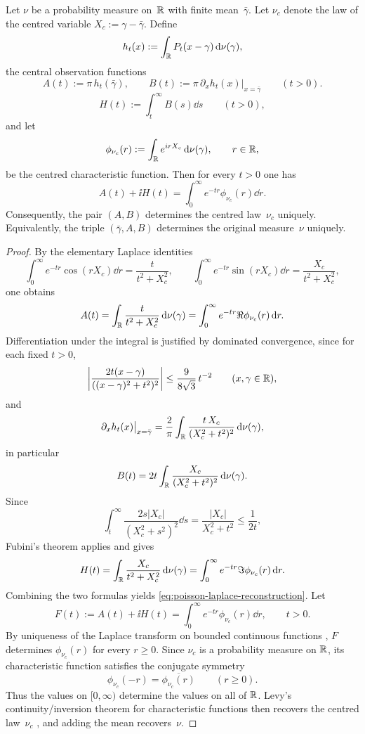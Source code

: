 \begin{proposition}%
\label{prop:poisson-central-two-channel}
Let $\nu$ be a probability measure on~$\mathbb{R}$ with finite mean~$\bar{\gamma}$.
Let $\nu_c$ denote the law of the centred variable
$X_c:=\gamma-\bar{\gamma}$.  Define
\[
h_t(x):=\int_{\mathbb{R}}P_t(x-\gamma)\,\mathrm{d}\nu(\gamma),
\]
the central observation functions
\[
A(t):=\pi\,h_t(\bar{\gamma}),
\qquad
B(t):=\pi\,\partial_x h_t(x)\big|_{x=\bar{\gamma}}
\qquad(t>0).
\]
\[
H(t):=\int_t^\infty B(s)\dd s
\qquad(t>0),
\]
and let
\[
\phi_{\nu_c}(r):=\int_{\mathbb{R}}e^{irX_c}\,\mathrm{d}\nu(\gamma),
\qquad r\in\mathbb{R},
\]
be the centred characteristic function.  Then for every $t>0$ one has
\begin{equation}\label{eq:poisson-laplace-reconstruction}
A(t)+\ii H(t)
=\int_0^\infty e^{-tr}\phi_{\nu_c}(r)\dd r.
\end{equation}
Consequently, the pair $(A,B)$ determines the centred law~$\nu_c$
uniquely.  Equivalently, the triple $(\bar{\gamma},A,B)$ determines the
original measure~$\nu$ uniquely.
\end{proposition}

\begin{proof}
By the elementary Laplace identities
\[
\int_0^\infty e^{-tr}\cos(rX_c)\dd r=\frac{t}{t^2+X_c^2},
\qquad
\int_0^\infty e^{-tr}\sin(rX_c)\dd r=\frac{X_c}{t^2+X_c^2},
\]
one obtains
\[
A(t)
=\int_{\mathbb{R}}\frac{t}{t^2+X_c^2}\,\mathrm{d}\nu(\gamma)
=\int_0^\infty e^{-tr}\Re\phi_{\nu_c}(r)\,\mathrm{d} r.
\]
Differentiation under the integral is justified by dominated convergence,
since for each fixed $t>0$,
\[
\left|\frac{2t(x-\gamma)}{((x-\gamma)^2+t^2)^2}\right|
\le \frac{9}{8\sqrt3}\,t^{-2}
\qquad(x,\gamma\in\mathbb{R}),
\]
and
\[
\partial_x h_t(x)\big|_{x=\bar{\gamma}}
=\frac{2}{\pi}\int_{\mathbb{R}}\frac{t\,X_c}{(X_c^2+t^2)^2}\,\mathrm{d}\nu(\gamma),
\]
in particular
\[
B(t)=2t\int_{\mathbb{R}}\frac{X_c}{(X_c^2+t^2)^2}\,\mathrm{d}\nu(\gamma).
\]
Since
\[
\int_t^\infty \frac{2s|X_c|}{(X_c^2+s^2)^2}\dd s
=\frac{|X_c|}{X_c^2+t^2}
\le \frac{1}{2t},
\]
Fubini's theorem applies and gives
\[
H(t)
=\int_{\mathbb{R}}\frac{X_c}{t^2+X_c^2}\,\mathrm{d}\nu(\gamma)
=\int_0^\infty e^{-tr}\Im\phi_{\nu_c}(r)\,\mathrm{d} r.
\]
Combining the two formulas yields
\eqref{eq:poisson-laplace-reconstruction}.  Let
\[
F(t):=A(t)+\ii H(t)
=\int_0^\infty e^{-tr}\phi_{\nu_c}(r)\dd r,
\qquad t>0 .
\]
By uniqueness of the Laplace transform on bounded continuous functions
\cite{Widder1941}, \(F\) determines \(\phi_{\nu_c}(r)\) for every
\(r\ge0\).  Since \(\nu_c\) is a probability measure on \(\mathbb{R}\), its
characteristic function satisfies the conjugate symmetry
\[
\phi_{\nu_c}(-r)=\overline{\phi_{\nu_c}(r)}
\qquad(r\ge0).
\]
Thus the values on \( [0,\infty) \) determine the values on all of
\(\mathbb{R}\).  Levy's continuity/inversion theorem for characteristic functions
then recovers the centred law~$\nu_c$ \cite{Lukacs1970,Feller1971}, and
adding the mean recovers~$\nu$.
\end{proof}

